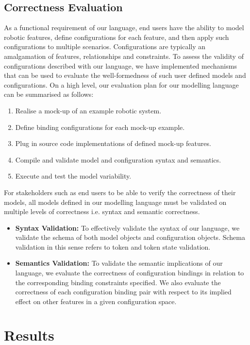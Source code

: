 \documentclass[conference]{IEEEtran}
\begin{document}
\subsection{Correctness Evaluation}
As a functional requirement of our language, end users have the ability to model robotic features, define configurations for each feature, and then apply such configurations to multiple scenarios. Configurations are typically an amalgamation of features, relationships and constraints. To assess the validity of configurations described with our language, we have implemented mechanisms that can be used to evaluate the well-formedness of such user defined models and configurations. On a high level, our evaluation plan for our modelling language can be summarised as follows:
\begin{enumerate}
  \item Realise a mock-up of an example robotic system.
  \item Define binding configurations for each mock-up example.
  \item Plug in source code implementations of defined mock-up features.
  \item Compile and validate model and configuration syntax and semantics.
  \item Execute and test the model variability.
\end{enumerate}
For stakeholders such as end users to be able to verify the correctness of their models, all models defined in our modelling language must be validated on multiple levels of correctness i.e. syntax and semantic correctness. 
\begin{itemize}[label={}]
  \item \textbf{Syntax Validation: }To effectively validate the syntax of our language, we validate the schema of both model objects and configuration objects. Schema validation in this sense refers to token and token state validation.
 
  \item \textbf{Semantics Validation: } To validate the semantic implications of our language, we evaluate the correctness of configuration bindings in relation to the corresponding binding constraints specified. We also evaluate the correctness of each configuration binding pair with respect to its implied effect on other features in a given configuration space.
  
\end{itemize}


\section{Results}
\end{document}
